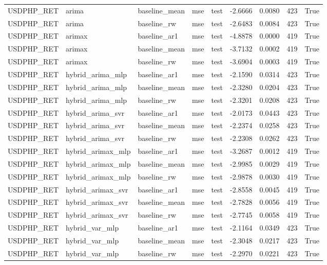 \begin{tabular}{lllllrrrr}
USDPHP_RET & arima & baseline_mean & mse & test & -2.6666 & 0.0080 & 423 & True \\
USDPHP_RET & arima & baseline_rw & mse & test & -2.6483 & 0.0084 & 423 & True \\
USDPHP_RET & arimax & baseline_ar1 & mse & test & -4.8878 & 0.0000 & 419 & True \\
USDPHP_RET & arimax & baseline_mean & mse & test & -3.7132 & 0.0002 & 419 & True \\
USDPHP_RET & arimax & baseline_rw & mse & test & -3.6904 & 0.0003 & 419 & True \\
USDPHP_RET & hybrid_arima_mlp & baseline_ar1 & mse & test & -2.1590 & 0.0314 & 423 & True \\
USDPHP_RET & hybrid_arima_mlp & baseline_mean & mse & test & -2.3280 & 0.0204 & 423 & True \\
USDPHP_RET & hybrid_arima_mlp & baseline_rw & mse & test & -2.3201 & 0.0208 & 423 & True \\
USDPHP_RET & hybrid_arima_svr & baseline_ar1 & mse & test & -2.0173 & 0.0443 & 423 & True \\
USDPHP_RET & hybrid_arima_svr & baseline_mean & mse & test & -2.2374 & 0.0258 & 423 & True \\
USDPHP_RET & hybrid_arima_svr & baseline_rw & mse & test & -2.2308 & 0.0262 & 423 & True \\
USDPHP_RET & hybrid_arimax_mlp & baseline_ar1 & mse & test & -3.2687 & 0.0012 & 419 & True \\
USDPHP_RET & hybrid_arimax_mlp & baseline_mean & mse & test & -2.9985 & 0.0029 & 419 & True \\
USDPHP_RET & hybrid_arimax_mlp & baseline_rw & mse & test & -2.9878 & 0.0030 & 419 & True \\
USDPHP_RET & hybrid_arimax_svr & baseline_ar1 & mse & test & -2.8558 & 0.0045 & 419 & True \\
USDPHP_RET & hybrid_arimax_svr & baseline_mean & mse & test & -2.7828 & 0.0056 & 419 & True \\
USDPHP_RET & hybrid_arimax_svr & baseline_rw & mse & test & -2.7745 & 0.0058 & 419 & True \\
USDPHP_RET & hybrid_var_mlp & baseline_ar1 & mse & test & -2.1164 & 0.0349 & 423 & True \\
USDPHP_RET & hybrid_var_mlp & baseline_mean & mse & test & -2.3048 & 0.0217 & 423 & True \\
USDPHP_RET & hybrid_var_mlp & baseline_rw & mse & test & -2.2970 & 0.0221 & 423 & True \\

\end{tabular}
